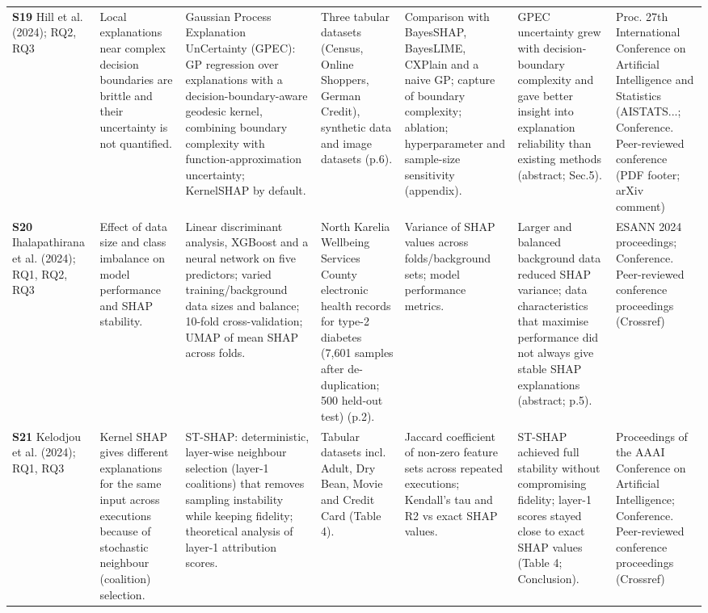 \begin{longtable}{@{}P{1.55cm}P{2.9cm}P{4.5cm}P{3.2cm}P{3.4cm}P{4.6cm}P{3.6cm}@{}}
\textbf{S19} \cite{S19} Hill et al. (2024); RQ2, RQ3 & Local explanations near complex decision boundaries are brittle and their uncertainty is not quantified. & Gaussian Process Explanation UnCertainty (GPEC): GP regression over explanations with a decision-boundary-aware geodesic kernel, combining boundary complexity with function-approximation uncertainty; KernelSHAP by default. & Three tabular datasets (Census, Online Shoppers, German Credit), synthetic data and image datasets (p.6). & Comparison with BayesSHAP, BayesLIME, CXPlain and a naive GP; capture of boundary complexity; ablation; hyperparameter and sample-size sensitivity (appendix). & GPEC uncertainty grew with decision-boundary complexity and gave better insight into explanation reliability than existing methods (abstract; Sec.5). & Proc. 27th International Conference on Artificial Intelligence and Statistics (AISTATS...; Conference. Peer-reviewed conference (PDF footer; arXiv comment) \\
\textbf{S20} \cite{S20} Ihalapathirana et al. (2024); RQ1, RQ2, RQ3 & Effect of data size and class imbalance on model performance and SHAP stability. & Linear discriminant analysis, XGBoost and a neural network on five predictors; varied training/\allowbreak{}background data sizes and balance; 10-fold cross-validation; UMAP of mean \textbar{}SHAP\textbar{} across folds. & North Karelia Wellbeing Services County electronic health records for type-2 diabetes (7,601 samples after de-duplication; 500 held-out test) (p.2). & Variance of SHAP values across folds/\allowbreak{}background sets; model performance metrics. & Larger and balanced background data reduced SHAP variance; data characteristics that maximise performance did not always give stable SHAP explanations (abstract; p.5). & ESANN 2024 proceedings; Conference. Peer-reviewed conference proceedings (Crossref) \\
\textbf{S21} \cite{S21} Kelodjou et al. (2024); RQ1, RQ3 & Kernel SHAP gives different explanations for the same input across executions because of stochastic neighbour (coalition) selection. & ST-SHAP: deterministic, layer-wise neighbour selection (layer-1 coalitions) that removes sampling instability while keeping fidelity; theoretical analysis of layer-1 attribution scores. & Tabular datasets incl. Adult, Dry Bean, Movie and Credit Card (Table 4). & Jaccard coefficient of non-zero feature sets across repeated executions; Kendall's tau and R2 vs exact SHAP values. & ST-SHAP achieved full stability without compromising fidelity; layer-1 scores stayed close to exact SHAP values (Table 4; Conclusion). & Proceedings of the AAAI Conference on Artificial Intelligence; Conference. Peer-reviewed conference proceedings (Crossref) \\

\end{longtable}
